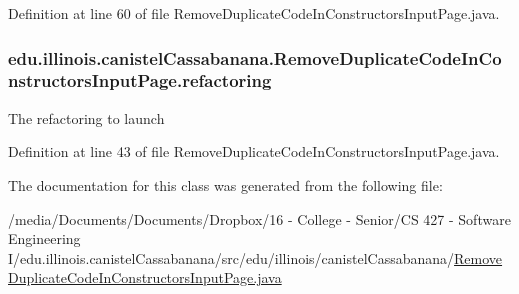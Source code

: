 Definition at line 60 of file RemoveDuplicateCodeInConstructorsInputPage.java.

\hypertarget{classedu_1_1illinois_1_1canistelCassabanana_1_1RemoveDuplicateCodeInConstructorsInputPage_a70db3718069b9b46170f0cc912086da2}{
\subsubsection[{refactoring}]{ {\bf edu.illinois.canistelCassabanana.RemoveDuplicateCodeInConstructorsInputPage.refactoring}}}
\label{classedu_1_1illinois_1_1canistelCassabanana_1_1RemoveDuplicateCodeInConstructorsInputPage_a70db3718069b9b46170f0cc912086da2}
The refactoring to launch 

Definition at line 43 of file RemoveDuplicateCodeInConstructorsInputPage.java.



The documentation for this class was generated from the following file:\begin{DoxyCompactItemize}
\item 
/media/Documents/Documents/Dropbox/16 -\/ College -\/ Senior/CS 427 -\/ Software Engineering I/edu.illinois.canistelCassabanana/src/edu/illinois/canistelCassabanana/\hyperlink{RemoveDuplicateCodeInConstructorsInputPage_8java}{RemoveDuplicateCodeInConstructorsInputPage.java}\end{DoxyCompactItemize}
